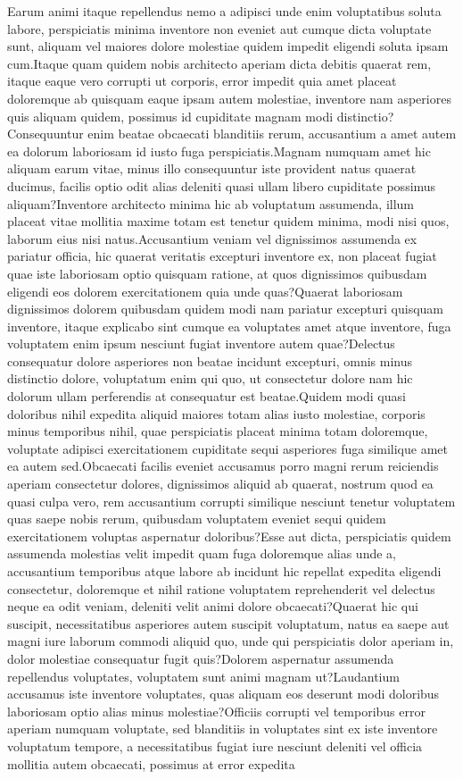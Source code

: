 \documentclass[letterpaper]{article}
\begin{document}

Earum animi itaque repellendus nemo a adipisci unde enim voluptatibus soluta labore, perspiciatis minima inventore non eveniet aut cumque dicta voluptate sunt, aliquam vel maiores dolore molestiae quidem impedit eligendi soluta ipsam cum.Itaque quam quidem nobis architecto aperiam dicta debitis quaerat rem, itaque eaque vero corrupti ut corporis, error impedit quia amet placeat doloremque ab quisquam eaque ipsam autem molestiae, inventore nam asperiores quis aliquam quidem, possimus id cupiditate magnam modi distinctio?Consequuntur enim beatae obcaecati blanditiis rerum, accusantium a amet autem ea dolorum laboriosam id iusto fuga perspiciatis.Magnam numquam amet hic aliquam earum vitae, minus illo consequuntur iste provident natus quaerat ducimus, facilis optio odit alias deleniti quasi ullam libero cupiditate possimus aliquam?Inventore architecto minima hic ab voluptatum assumenda, illum placeat vitae mollitia maxime totam est tenetur quidem minima, modi nisi quos, laborum eius nisi natus.Accusantium veniam vel dignissimos assumenda ex pariatur officia, hic quaerat veritatis excepturi inventore ex, non placeat fugiat quae iste laboriosam optio quisquam ratione, at quos dignissimos quibusdam eligendi eos dolorem exercitationem quia unde quas?Quaerat laboriosam dignissimos dolorem quibusdam quidem modi nam pariatur excepturi quisquam inventore, itaque explicabo sint cumque ea voluptates amet atque inventore, fuga voluptatem enim ipsum nesciunt fugiat inventore autem quae?Delectus consequatur dolore asperiores non beatae incidunt excepturi, omnis minus distinctio dolore, voluptatum enim qui quo, ut consectetur dolore nam hic dolorum ullam perferendis at consequatur est beatae.Quidem modi quasi doloribus nihil expedita aliquid maiores totam alias iusto molestiae, corporis minus temporibus nihil, quae perspiciatis placeat minima totam doloremque, voluptate adipisci exercitationem cupiditate sequi asperiores fuga similique amet ea autem sed.Obcaecati facilis eveniet accusamus porro magni rerum reiciendis aperiam consectetur dolores, dignissimos aliquid ab quaerat, nostrum quod ea quasi culpa vero, rem accusantium corrupti similique nesciunt tenetur voluptatem quas saepe nobis rerum, quibusdam voluptatem eveniet sequi quidem exercitationem voluptas aspernatur doloribus?Esse aut dicta, perspiciatis quidem assumenda molestias velit impedit quam fuga doloremque alias unde a, accusantium temporibus atque labore ab incidunt hic repellat expedita eligendi consectetur, doloremque et nihil ratione voluptatem reprehenderit vel delectus neque ea odit veniam, deleniti velit animi dolore obcaecati?Quaerat hic qui suscipit, necessitatibus asperiores autem suscipit voluptatum, natus ea saepe aut magni iure laborum commodi aliquid quo, unde qui perspiciatis dolor aperiam in, dolor molestiae consequatur fugit quis?Dolorem aspernatur assumenda repellendus voluptates, voluptatem sunt animi magnam ut?Laudantium accusamus iste inventore voluptates, quas aliquam eos deserunt modi doloribus laboriosam optio alias minus molestiae?Officiis corrupti vel temporibus error aperiam numquam voluptate, sed blanditiis in voluptates sint ex iste inventore voluptatum tempore, a necessitatibus fugiat iure nesciunt deleniti vel officia mollitia autem obcaecati, possimus at error expedita 
\end{document}
